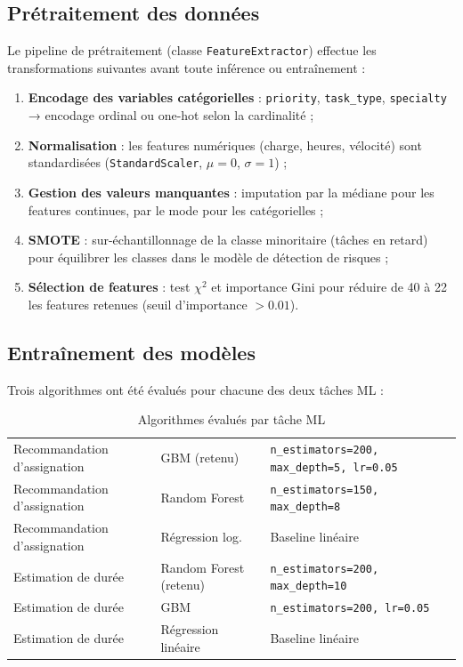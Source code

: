 \subsection{Prétraitement des données}

Le pipeline de prétraitement (classe \texttt{FeatureExtractor}) effectue
les transformations suivantes avant toute inférence ou entraînement :

\begin{enumerate}
  \item \textbf{Encodage des variables catégorielles} : \texttt{priority},
        \texttt{task\_type}, \texttt{specialty} → encodage ordinal ou one-hot
        selon la cardinalité ;
  \item \textbf{Normalisation} : les features numériques (charge, heures, vélocité)
        sont standardisées (\texttt{StandardScaler}, $\mu=0$, $\sigma=1$) ;
  \item \textbf{Gestion des valeurs manquantes} : imputation par la médiane pour
        les features continues, par le mode pour les catégorielles ;
  \item \textbf{SMOTE} : sur-échantillonnage de la classe minoritaire (tâches
        en retard) pour équilibrer les classes dans le modèle de détection de risques ;
  \item \textbf{Sélection de features} : test $\chi^2$ et importance Gini pour
        réduire de 40 à 22 les features retenues (seuil d'importance $> 0.01$).
\end{enumerate}

\subsection{Entraînement des modèles}

Trois algorithmes ont été évalués pour chacune des deux tâches ML :

\begin{table}[H]
  \centering
  \caption{Algorithmes évalués par tâche ML}
  \label{tab:algos_ml}
  \begin{tabularx}{\textwidth}{L{5cm}L{3.5cm}X}
    \toprule
     &  &  \\
    \midrule
    Recommandation d'assignation  & GBM (retenu)       & \texttt{n\_estimators=200, max\_depth=5, lr=0.05} \\
    Recommandation d'assignation  & Random Forest      & \texttt{n\_estimators=150, max\_depth=8} \\
    Recommandation d'assignation  & Régression log.    & Baseline linéaire \\
    Estimation de durée           & Random Forest (retenu) & \texttt{n\_estimators=200, max\_depth=10} \\
    Estimation de durée           & GBM                & \texttt{n\_estimators=200, lr=0.05} \\
    Estimation de durée           & Régression linéaire & Baseline linéaire \\
    \bottomrule
  \end{tabularx}
\end{table}

